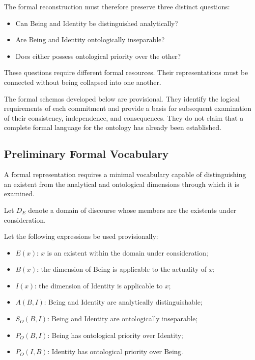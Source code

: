 The formal reconstruction must therefore preserve three
distinct questions:

\begin{itemize}
    \item Can Being and Identity be distinguished analytically?
    \item Are Being and Identity ontologically inseparable?
    \item Does either possess ontological priority over the other?
\end{itemize}

These questions require different formal resources. Their
representations must be connected without being collapsed
into one another.

The formal schemas developed below are provisional. They
identify the logical requirements of each commitment and
provide a basis for subsequent examination of their consistency,
independence, and consequences. They do not claim that a
complete formal language for the ontology has already been
established.

\subsection{Preliminary Formal Vocabulary}

A formal representation requires a minimal vocabulary
capable of distinguishing an existent from the analytical
and ontological dimensions through which it is examined.

Let \(D_E\) denote a domain of discourse whose members are
the existents under consideration.

Let the following expressions be used provisionally:

\begin{itemize}
    \item \(E(x)\): \(x\) is an existent within the domain
    under consideration;

    \item \(B(x)\): the dimension of Being is applicable
    to the actuality of \(x\);

    \item \(I(x)\): the dimension of Identity is applicable
    to \(x\);

    \item \(A(B,I)\): Being and Identity are analytically
    distinguishable;

    \item \(S_O(B,I)\): Being and Identity are ontologically
    inseparable;

    \item \(P_O(B,I)\): Being has ontological priority
    over Identity;

    \item \(P_O(I,B)\): Identity has ontological priority
    over Being.
\end{itemize}


